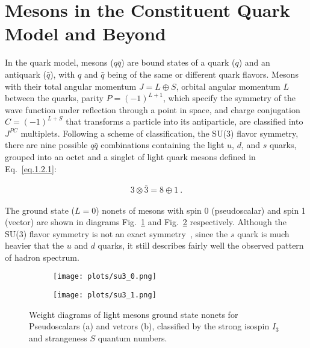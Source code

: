 \section{Mesons in the Constituent Quark Model and Beyond}
\label{p.1.2}

In the quark model, mesons ($q\bar{q}$) are bound states of a quark ($q$) and an antiquark ($\bar{q}$), with $q$ and $\bar{q}$ being of the same or different quark flavors. Mesons with their total angular momentum $J = L \oplus S$, orbital angular momentum $L$ between the quarks, parity $P=(-1)^{L+1}$, which specify the symmetry of the wave function under reflection through a point in space, and charge conjugation $C=(-1)^{L+S}$ that transforms a particle into its antiparticle, are classified into $J^{PC}$ multiplets. Following a scheme of classification, the SU(3) flavor symmetry, there are nine possible $q\bar{q}$ combinations containing the light $u$, $d$, and $s$ quarks, grouped into an octet and a singlet of light quark mesons defined in Eq.~\ref{eq.1.2.1}:

\begin{equation}
    \label{eq.1.2.1}
    \begin{aligned}
        3 \otimes \bar{3} = 8 \oplus 1~.
    \end{aligned}
\end{equation}

The ground state ($L=0$) nonets of mesons with spin 0 (pseudoscalar) and spin 1 (vector) are shown in diagrams Fig.~\ref{fig.1.2.1.a} and Fig.~\ref{fig.1.2.1.b} respectively. Although the SU(3) flavor symmetry is not an exact symmetry~\cite{5}, since the $s$ quark is much heavier that the $u $ and $d$ quarks, it still describes fairly well the observed pattern of hadron spectrum.

\begin{figure}[H]
    \centering
    \begin{subfigure}[H]{0.5\textwidth}
        \texttt{[image: plots/su3\_0.png]}
        \caption{}
        \label{fig.1.2.1.a}
    \end{subfigure}\hfill
    \begin{subfigure}[H]{0.5\textwidth}
        \texttt{[image: plots/su3\_1.png]}
        \caption{}
        \label{fig.1.2.1.b}
    \end{subfigure}
    \caption{Weight diagrams of light mesons ground state nonets for Pseudoscalars (a) and vetrors (b), classified by the strong isospin $I_3$ and strangeness $S$ quantum numbers.}
    \label{fig.1.2.1}
\end{figure}

